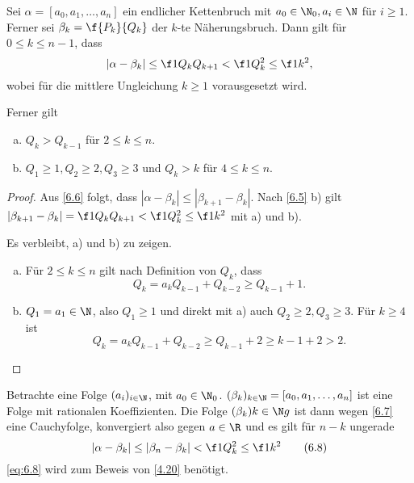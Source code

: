 \begin{st} \label{6.7}
	Sei $\alpha = [a_0, a_1, \dotsc, a_n]$ ein endlicher Kettenbruch mit $a_0 \in \N_0, a_i \in \N$ für $i \ge 1$.
	Ferner sei $\beta_k = \f {P_k}{Q_k}$ der $k$-te Näherungsbruch.
	Dann gilt für $0 \le k \le n-1$, dass
	\[
		| \alpha - \beta_k | \le \f 1{Q_k Q_{k+1}} < \f 1{Q_k^2} \le \f 1{k^2},
	\]
	wobei für die mittlere Ungleichung $k \ge 1$ vorausgesetzt wird.

	Ferner gilt
	\begin{enumerate}[a)]
		\item
			$Q_k > Q_{k-1}$ für $2 \le k \le n$.
		\item
			$Q_1 \ge 1, Q_2 \ge 2, Q_3 \ge 3$ und $Q_k > k$ für $4 \le k \le n$.
	\end{enumerate}
	\begin{proof}
		Aus \ref{6.6} folgt, dass $|\alpha - \beta_k| \le |\beta_{k+1} - \beta_k|$.
		Nach \ref{6.5} b) gilt $|\beta_{k+1} - \beta_k| = \f 1{Q_k Q_{k+1}} < \f 1{Q_k^2} \le \f 1{k^2}$ mit a) und b).

		Es verbleibt, a) und b) zu zeigen.
		\begin{enumerate}[a)]
			\item
				Für $2 \le k \le n$ gilt nach Definition von $Q_k$, dass
				\[
					Q_k = a_k Q_{k-1} + Q_{k-2}
					\ge Q_{k-1} + 1.
				\]
			\item
				$Q_1 = a_1 \in \N$, also $Q_1 \ge 1$ und direkt mit a) auch $Q_2 \ge 2, Q_3 \ge 3$.
				Für $k \ge 4$ ist
				\[
					Q_k = a_k Q_{k-1} + Q_{k-2}
					\ge Q_{k-1} + 2
					\ge k - 1 + 2
					> 2.
				\]
		\end{enumerate}
	\end{proof}
\end{st}

Betrachte eine Folge $(a_i)_{i \in \N}$, mit $a_0 \in \N_0$.
$(\beta_k)_{k\in\N} = [a_0, a_1, \dotsc, a_n]$ ist eine Folge mit rationalen Koeffizienten.
Die Folge $(\beta_k){k \in \N}g$ ist dann wegen \ref{6.7} eine Cauchyfolge, konvergiert also gegen $a \in \R$ und es gilt für $n - k$ ungerade
\begin{equation}
	\label{eq:6.8} %
	|\alpha - \beta_k| \le | \beta_n - \beta_k| < \f 1{Q_k^2} \le \f 1{k^2}
	\tag{6.8}
\end{equation}
\eqref{eq:6.8} wird zum Beweis von \ref{4.20} benötigt.

